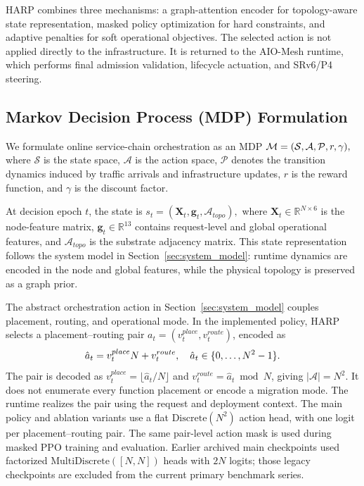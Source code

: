 \documentclass[final,5p]{elsarticle}
\newcommand{\rev}[1]{\textcolor{revisiongreen}{#1}}
\let\newrev\rev
\begin{document}
HARP combines three mechanisms: a graph-attention encoder for topology-aware state representation, masked policy optimization for hard constraints, and adaptive penalties for soft operational objectives. The selected action is not applied directly to the infrastructure. It is returned to the AIO-Mesh runtime, which performs final admission validation, lifecycle actuation, and SRv6/P4 steering.

\subsection{\newrev{Markov Decision Process (MDP) Formulation}}
\label{subsec:harp_mdp}

We formulate online service-chain orchestration as an \newrev{MDP}
$ \rev{\mathcal{M}=(\mathcal{S},\mathcal{A},\mathcal{P},r,\gamma),}$
where \(\mathcal{S}\) is the state space, \(\mathcal{A}\) is the action space, \(\mathcal{P}\) denotes the transition dynamics induced by traffic arrivals and infrastructure updates, \rev{\(r\)} is the reward function, and \(\gamma\) is the discount factor.

At decision epoch \(t\), the state is $ s_t=(\mathbf{X}_t,\mathbf{g}_t,\mathcal{A}_{topo}),$
where \(\mathbf{X}_t\in\mathbb{R}^{N\times 6}\) is the node-feature matrix, \(\mathbf{g}_t\in\mathbb{R}^{13}\) contains request-level and global operational features, and \(\mathcal{A}_{topo}\) is the substrate adjacency matrix. This state representation follows the system model in Section~\ref{sec:system_model}: runtime dynamics are encoded in the node and global features, while the physical topology is preserved as a graph prior.

The abstract orchestration action in Section~\ref{sec:system_model} couples placement, routing, and operational mode. \rev{In the implemented policy, HARP selects a placement--routing pair \(a_t=(v_t^{place},v_t^{route})\), encoded as}
\begin{equation}
\rev{\hat a_t=v_t^{place}N+v_t^{route},\quad \hat a_t\in\{0,\ldots,N^2-1\}.}
\label{eq:harp_action_encoding}
\end{equation}
\rev{The pair is decoded as \(v_t^{place}=\lfloor\hat a_t/N\rfloor\) and \(v_t^{route}=\hat a_t\bmod N\), giving \(|\mathcal A|=N^2\). It does not enumerate every function placement or encode a migration mode. The runtime realizes the pair using the request and deployment context. The main policy and ablation variants use a flat \(\mathrm{Discrete}(N^2)\) action head, with one logit per placement--routing pair. The same pair-level action mask is used during masked PPO training and evaluation. Earlier archived main checkpoints used factorized \(\mathrm{MultiDiscrete}([N,N])\) heads with \(2N\) logits; those legacy checkpoints are excluded from the current primary benchmark series.}
\end{document}
